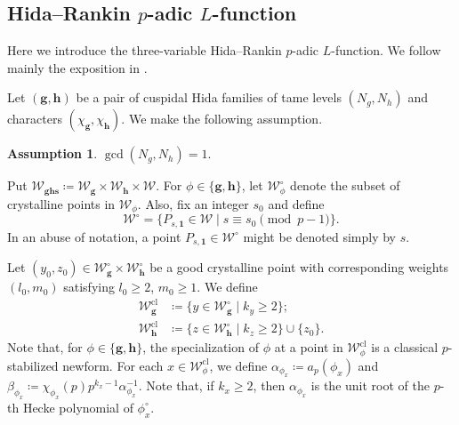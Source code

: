 \documentclass[a4paper,11pt]{amsart}
\theoremstyle{plain}
\theoremstyle{definition}
\newtheorem{ass}[theorem]{Assumption}
\theoremstyle{remark}
\newcommand{\cl}{\mathcal}
\newcommand{\hg}{{\mathbf{g}}}
\newcommand{\hh}{{\mathbf h}}
\numberwithin{equation}{section}
\begin{document}
\subsection{Hida--Rankin $p$-adic $L$-function}\label{subsec:Hida-Rankin}


Here we introduce the three-variable Hida--Rankin $p$-adic $L$-function. We follow mainly the exposition in \cite{KLZ}.

Let $(\hg,\hh)$ be a pair of cuspidal Hida families of tame levels $(N_g,N_h)$ and characters $(\chi_{\hg},\chi_{\hh})$. We make the following assumption.

\begin{ass}
    $\gcd(N_g,N_h)=1$.
\end{ass}

Put $\cl{W}_{\hg \hh \mathbf{s}}\coloneqq \cl{W}_{\hg}\times \cl{W}_{\hh}\times \cl{W}$.
For $\phi\in\lbrace \hg,\hh\rbrace$, let $\cl{W}_{\phi}^\circ$ denote the subset of crystalline points in $\cl{W}_{\phi}$. Also, fix an integer $s_0$ and define
\[
\cl{W}^\circ=\lbrace P_{s,\bm{1}}\in \cl{W}\;\vert\; s\equiv s_0 \pmod{p-1}\rbrace.
\]
In an abuse of notation, a point $P_{s,\bm{1}}\in \cl{W}^\circ$ might be denoted simply by $s$.

Let $(y_0,z_0)\in \cl{W}_{\hg}^\circ\times \cl{W}_{\hh}^\circ$ be a good crystalline point with corresponding weights $(l_0,m_0)$ satisfying $l_0\geq 2$, $m_0\geq 1$. We define
\begin{align*}
\cl{W}_{\hg}^{\mathrm{cl}}&\coloneqq \lbrace y\in \cl{W}_{\hg}^\circ \;\vert\; k_y\geq 2 \rbrace; \\
\cl{W}_{\hh}^{\mathrm{cl}}&\coloneqq \lbrace z\in \cl{W}_{\hh}^\circ \;\vert\; k_z\geq 2\rbrace \cup \lbrace z_0\rbrace.
\end{align*}
Note that, for $\phi\in\lbrace \hg,\hh\rbrace$, the specialization of $\phi$ at a point in $\cl{W}_{\phi}^{\mathrm{cl}}$ is a classical $p$-stabilized newform. For each $x\in \cl{W}_{\phi}^{\mathrm{cl}}$, we define $\alpha_{\phi_x}\coloneqq a_p(\phi_x)$ and $\beta_{\phi_x}\coloneqq\chi_{\phi_x}(p)p^{k_x-1}\alpha_{\phi_x}^{-1}$. Note that, if $k_x\geq 2$, then $\alpha_{\phi_x}$ is the unit root of the $p$-th Hecke polynomial of $\phi_x^{\circ}$.
\end{document}
